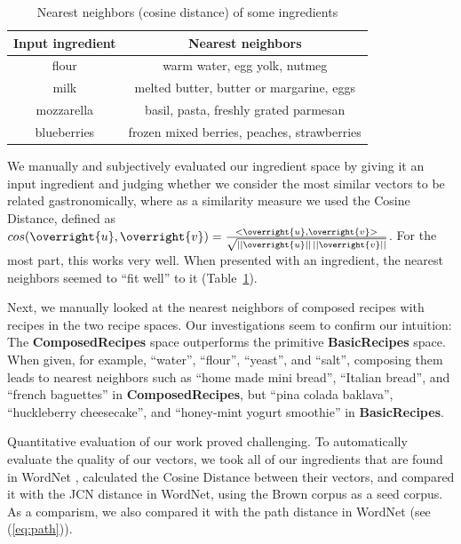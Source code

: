 \begin{table}
\begin{center}
\begin{tabular}{cc}
	\toprule
	\textbf{Input ingredient} & \textbf{Nearest neighbors}\\
	\midrule
	flour & warm water, egg yolk, nutmeg\\
	milk & melted butter, butter or margarine, eggs\\
	mozzarella & basil, pasta, freshly grated parmesan\\
	blueberries & frozen mixed berries, peaches, strawberries\\
	\bottomrule
\end{tabular}
\end{center}
\caption{Nearest neighbors (cosine distance) of some ingredients}
\label{nningredients}
\end{table}

We manually and subjectively evaluated our ingredient space by giving it an input ingredient and judging whether we consider the most similar vectors to be related gastronomically, where as a similarity measure we used the Cosine Distance, defined as $cos(\overright{u},\overright{v}) = \frac{<\overright{u},\overright{v}>}{\sqrt{||\overright{u}||\,||\overright{v}||}}$. For the most part, this works very well. When presented with an ingredient, the nearest neighbors seemed to ``fit well'' to it (Table~\ref{nningredients}).

Next, we manually looked at the nearest neighbors of composed recipes with recipes in the two recipe spaces. Our investigations seem to confirm our intuition: The \textbf{ComposedRecipes} space outperforms the primitive \textbf{BasicRecipes} space. When given, for example, ``water'', ``flour'', ``yeast'', and ``salt'', composing them leads to nearest neighbors such as ``home made mini bread'', ``Italian bread'', and ``french baguettes'' in \textbf{ComposedRecipes}, but ``pina colada baklava'', ``huckleberry cheesecake'', and ``honey-mint yogurt smoothie'' in \textbf{BasicRecipes}.

Quantitative evaluation of our work proved challenging. To automatically evaluate the quality of our vectors, we took all of our ingredients that are found in WordNet \citep{miller1995wordnet},
calculated the Cosine Distance between their vectors, and compared it with the JCN distance \citep[see (\ref{eq:jcn})\footnote{IC is the information content of a concept based on some corpus, LCS is the least common subsumer, i.e. the deepest node that subsumes both ingredients.}]{jiang1997semantic}
in WordNet, using the Brown corpus \citep{francis1979brown} as a seed corpus. As a comparism, we also compared it with the path distance in WordNet (see (\ref{eq:path})).

